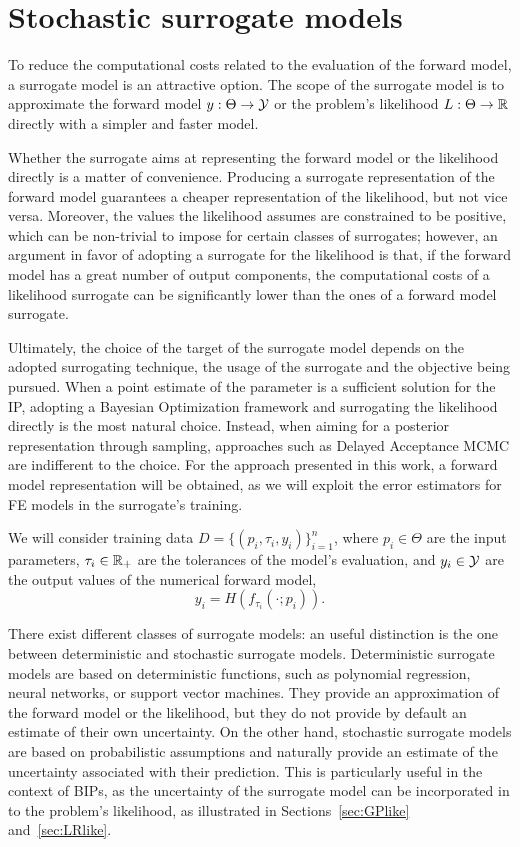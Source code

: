 \section{Stochastic surrogate models}\label{sec:surrogates}
To reduce the computational costs related to the evaluation of the forward model, a surrogate model is an attractive option.
The scope of the surrogate model is to approximate the forward model $y : \Theta \rightarrow \mathcal Y $ or the problem's likelihood $L: \Theta \rightarrow \mathbb{R} $ directly with a simpler and faster model.\medbreak

Whether the surrogate aims at representing the forward model or the likelihood directly is a matter of convenience.
Producing a surrogate representation of the forward model guarantees a cheaper representation of the likelihood, but not vice versa. Moreover, the values the likelihood assumes are constrained to be positive, which can be non-trivial to impose for certain classes of surrogates; however, an argument in favor of adopting a surrogate for the likelihood is that, if the forward model has a great number of output components, the computational costs of a likelihood surrogate can be significantly lower than the ones of a forward model surrogate.

Ultimately, the choice of the target of the surrogate model depends on the adopted surrogating technique, the usage of the surrogate and the objective being pursued.
When a point estimate of the parameter is a sufficient solution for the IP, adopting a Bayesian Optimization framework and surrogating the likelihood directly is the most natural choice.
Instead, when aiming for a posterior representation through sampling, approaches such as Delayed Acceptance MCMC \cite{ChristenFox2005} are indifferent to the choice.
For the approach presented in this work, a forward model representation will be obtained, as we will exploit the error estimators for FE models in the surrogate's training. \medbreak

We will consider training data $ D =\{ (p_i, \tau_i, y_i) \}_{i=1}^n $, where $ p_i \in \Theta $ are the input parameters, $ \tau_i \in \mathbb{R}_+ $ are the tolerances of the model's evaluation, and $ y_i \in \mathcal Y $ are the output values of the numerical forward model,\[ y_i = H(f_{\tau_i}(\cdot; p_i)). \]

There exist different classes of surrogate models: an useful distinction is the one between deterministic and stochastic surrogate models.
Deterministic surrogate models are based on deterministic functions, such as polynomial regression, neural networks, or support vector machines.
They provide an approximation of the forward model or the likelihood, but they do not provide by default an estimate of their own uncertainty.
On the other hand, stochastic surrogate models are based on probabilistic assumptions and naturally provide an estimate of the uncertainty associated with their prediction.
This is particularly useful in the context of BIPs, as the uncertainty of the surrogate model can be incorporated in to the problem's likelihood, as illustrated in Sections~\ref{sec:GPlike} and~\ref{sec:LRlike}. \medbreak

